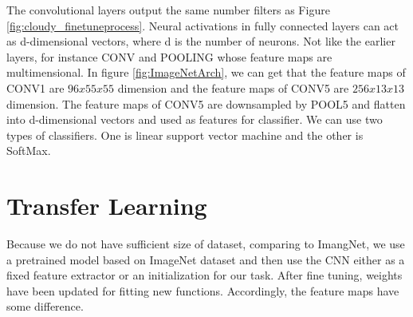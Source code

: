 The convolutional layers output the same number filters as Figure \ref{fig:cloudy_finetuneprocess}. Neural activations in fully connected layers can act as d-dimensional vectors, where d is the number of neurons. Not like the earlier layers, for instance CONV and POOLING whose feature maps are multimensional. In figure \ref{fig:ImageNetArch}, we can get that the feature maps of CONV1 are $96x55x55$ dimension and the feature maps of CONV5 are $256x13x13$ dimension. The feature maps of CONV5 are downsampled by POOL5 and flatten into d-dimensional vectors and used as features for classifier. We can use two types of classifiers. One is linear support vector machine and the other is SoftMax.

\section{Transfer Learning}

Because we do not have sufficient size of dataset, comparing to ImangNet, we use a pretrained model based on ImageNet dataset and then use the CNN either as a fixed feature extractor or an initialization for our task. After fine tuning, weights have been updated for fitting new functions. Accordingly, the feature maps have some difference.

